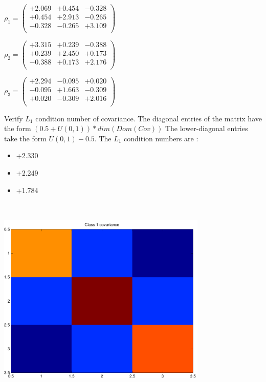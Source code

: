 \documentclass[9pt]{article}
\theoremstyle{plain}
\theoremstyle{definition}
\theoremstyle{remark}
\numberwithin{equation}{section}
\begin{document}
$\rho_1 = \left(
\begin{array}{
ccc}
+2.069 & +0.454 & -0.328 \\
+0.454 & +2.913 & -0.265 \\
-0.328 & -0.265 & +3.109 \\
\end{array}
\right)$ \newline 

$\rho_2 = \left(
\begin{array}{
ccc}
+3.315 & +0.239 & -0.388 \\
+0.239 & +2.450 & +0.173 \\
-0.388 & +0.173 & +2.176 \\
\end{array}
\right)$ \newline 

$\rho_3 = \left(
\begin{array}{
ccc}
+2.294 & -0.095 & +0.020 \\
-0.095 & +1.663 & -0.309 \\
+0.020 & -0.309 & +2.016 \\
\end{array}
\right)$ \newline 

Verify $L_1$ condition number of covariance. The diagonal entries of the matrix have the form $(0.5 + U(0,1) )*dim(Dom(Cov))$
The lower-diagonal entries take the form $U(0,1) - 0.5$. 
The $L_1$ condition numbers are :
\begin{itemize}
\item +2.330
\item +2.249
\item +1.784
\end{itemize}
\includegraphics[width=10.0cm,height=10.0cm]{rv1_corr.pdf}
\end{document}

